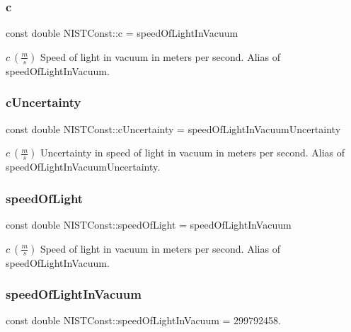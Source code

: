 \subsubsection{\texorpdfstring{c}{c}}
{\footnotesize\ttfamily const double N\+I\+S\+T\+Const\+::c = speed\+Of\+Light\+In\+Vacuum}

$c \ (\frac{m}{s})$ Speed of light in vacuum in meters per second. Alias of speed\+Of\+Light\+In\+Vacuum. \mbox{\label{group___n_i_s_t_const-_speed_of_light_ga21cb144a81f599986c7d6aff034bf6cb}} 
\subsubsection{\texorpdfstring{c\+Uncertainty}{cUncertainty}}
{\footnotesize\ttfamily const double N\+I\+S\+T\+Const\+::c\+Uncertainty = speed\+Of\+Light\+In\+Vacuum\+Uncertainty}

$c \ (\frac{m}{s})$ Uncertainty in speed of light in vacuum in meters per second. Alias of speed\+Of\+Light\+In\+Vacuum\+Uncertainty. \mbox{\label{group___n_i_s_t_const-_speed_of_light_ga0be1be2f994cccb0cc27bac50f6dd7a3}} 
\subsubsection{\texorpdfstring{speed\+Of\+Light}{speedOfLight}}
{\footnotesize\ttfamily const double N\+I\+S\+T\+Const\+::speed\+Of\+Light = speed\+Of\+Light\+In\+Vacuum}

$c \ (\frac{m}{s})$ Speed of light in vacuum in meters per second. Alias of speed\+Of\+Light\+In\+Vacuum. \mbox{\label{group___n_i_s_t_const-_speed_of_light_gacb4a04d9cca33259effabdd28c28e964}} 
\subsubsection{\texorpdfstring{speed\+Of\+Light\+In\+Vacuum}{speedOfLightInVacuum}}
{\footnotesize\ttfamily const double N\+I\+S\+T\+Const\+::speed\+Of\+Light\+In\+Vacuum = 299792458.}

